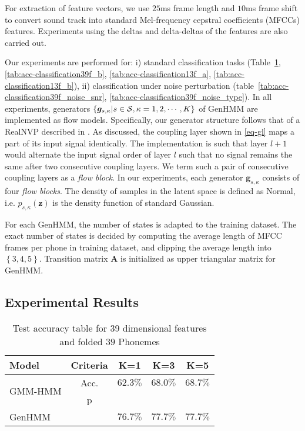 \documentclass{ecai}
\begin{document}
For extraction of feature vectors, we use $25$ms frame length and $10$ms frame shift to convert sound track into standard Mel-frequency cepstral coefficients (MFCCs) features. Experiments using the deltas and delta-deltas of the features are also carried out.


Our experiments are performed for: i) standard classification tasks (Table~\ref{tab:acc-classification39f_a}, \ref{tab:acc-classification39f_b}, \ref{tab:acc-classification13f_a}, \ref{tab:acc-classification13f_b}), ii) classification under noise perturbation (table~\ref{tab:acc-classification39f_noise_snr}, \ref{tab:acc-classification39f_noise_type}).
In all experiments, generators $\left\{\bm{g}_{s,\kappa}|s\in \mathcal{S}, \kappa=1, 2, \cdots, K \right\}$ of GenHMM are implemented as flow models. Specifically, our generator structure follows that of a RealNVP described in \cite{2016arXiv160508803D}.
As discussed, the coupling layer shown in \eqref{eq-gl} maps a part of its input signal identically.
The implementation is such that layer $l+1$ would alternate the input signal order of layer $l$ such that no signal remains the same after two consecutive coupling layers.
We term such a pair of consecutive coupling layers as a \textit{flow block}.
In our experiments, each generator $\bm{g}_{s,\kappa}$ consists of four \textit{flow blocks}.
The density of samples in the latent space is defined as Normal, i.e. $p_{s,\kappa}(\bm{z})$ is the density function of standard Gaussian.

For each GenHMM, the number of states is adapted to the training dataset.
The exact number of states is decided by computing the average length of MFCC frames per phone in training dataset, and clipping the average length into $\left\{ 3,4,5 \right\}$.
Transition matrix $\bm{A}$ is initialized as upper triangular matrix for GenHMM.

\subsection{Experimental Results}

\begin{table}
  \caption{Test accuracy table for $39$ dimensional features and folded $39$ Phonemes }\label{tab:acc-classification39f_a}
  \centering  
  \begin{tabular}{l|c|c|c|c}
    \toprule
    {Model}& Criteria &  K=1 &  K=3 &  K=5  \\  \midrule
    \multirow{2}{*}{GMM-HMM} & {Acc.} & $62.3\%$ &  $68.0\%$ &  $68.7\%$  \\
           & p &{} &{} &{}  \\ \midrule
    GenHMM & &$76.7\%$ & $77.7\%$ &  $77.7\%$ \\ 
    \bottomrule                                                                  
  \end{tabular}
\end{table}
\end{document}
